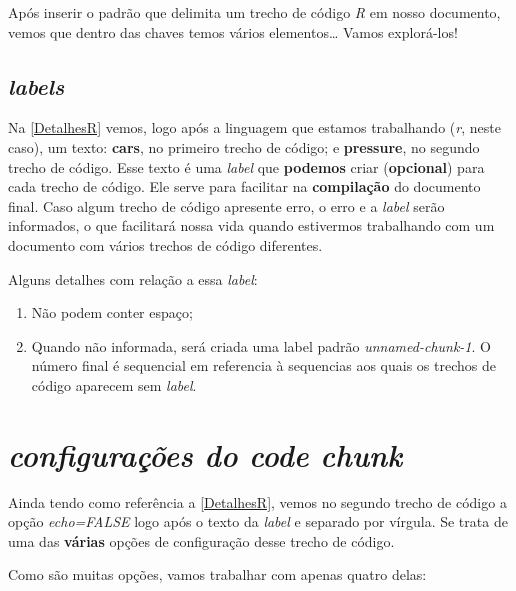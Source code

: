 \documentclass[]{book}
\providecommand{\tightlist}{%
  \setlength{\itemsep}{0pt}\setlength{\parskip}{0pt}}
\begin{document}
Após inserir o padrão que delimita um trecho de código \emph{R} em nosso documento, vemos que dentro das chaves temos vários elementos\ldots{} Vamos explorá-los!

\hypertarget{RLabels}{%
\section{\texorpdfstring{\emph{labels}}{labels}}\label{RLabels}}

Na \autoref{DetalhesR} vemos, logo após a linguagem que estamos trabalhando (\emph{r}, neste caso), um texto: \textbf{cars}, no primeiro trecho de código; e \textbf{pressure}, no segundo trecho de código. Esse texto é uma \emph{label} que \textbf{podemos} criar (\textbf{opcional}) para cada trecho de código. Ele serve para facilitar na \textbf{compilação} do documento final. Caso algum trecho de código apresente erro, o erro e a \emph{label} serão informados, o que facilitará nossa vida quando estivermos trabalhando com um documento com vários trechos de código diferentes.

Alguns detalhes com relação a essa \emph{label}:

\begin{enumerate}
\def\labelenumi{\arabic{enumi}.}
\tightlist
\item
  Não podem conter espaço;
\item
  Quando não informada, será criada uma label padrão \emph{unnamed-chunk-1}. O número final é sequencial em referencia à sequencias aos quais os trechos de código aparecem sem \emph{label}.
\end{enumerate}

\hypertarget{codeChunkConf}{%
\chapter{\texorpdfstring{\emph{configurações do \textbf{code chunk} }}{configurações do code chunk }}\label{codeChunkConf}}

Ainda tendo como referência a \autoref{DetalhesR}, vemos no segundo trecho de código a opção \emph{echo=FALSE} logo após o texto da \emph{label} e separado por vírgula. Se trata de uma das \textbf{várias} opções de configuração desse trecho de código.

Como são muitas opções, vamos trabalhar com apenas quatro delas:
\end{document}
